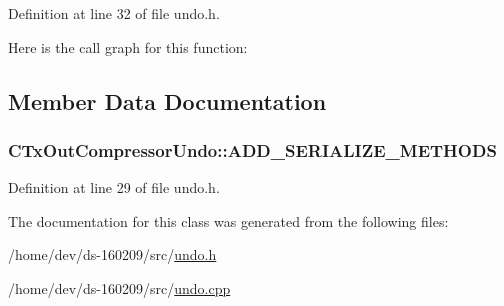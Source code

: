 Definition at line 32 of file undo.\+h.



Here is the call graph for this function\+:




\subsection{Member Data Documentation}
\hypertarget{class_c_tx_out_compressor_undo_a8519d03067bf052756ad81e022c51c5f}{}
\subsubsection[{A\+D\+D\+\_\+\+S\+E\+R\+I\+A\+L\+I\+Z\+E\+\_\+\+M\+E\+T\+H\+O\+D\+S}]{\setlength{\rightskip}{0pt plus 5cm}C\+Tx\+Out\+Compressor\+Undo\+::\+A\+D\+D\+\_\+\+S\+E\+R\+I\+A\+L\+I\+Z\+E\+\_\+\+M\+E\+T\+H\+O\+D\+S}\label{class_c_tx_out_compressor_undo_a8519d03067bf052756ad81e022c51c5f}


Definition at line 29 of file undo.\+h.



The documentation for this class was generated from the following files\+:\begin{DoxyCompactItemize}
\item 
/home/dev/ds-\/160209/src/\hyperlink{undo_8h}{undo.\+h}\item 
/home/dev/ds-\/160209/src/\hyperlink{undo_8cpp}{undo.\+cpp}\end{DoxyCompactItemize}
